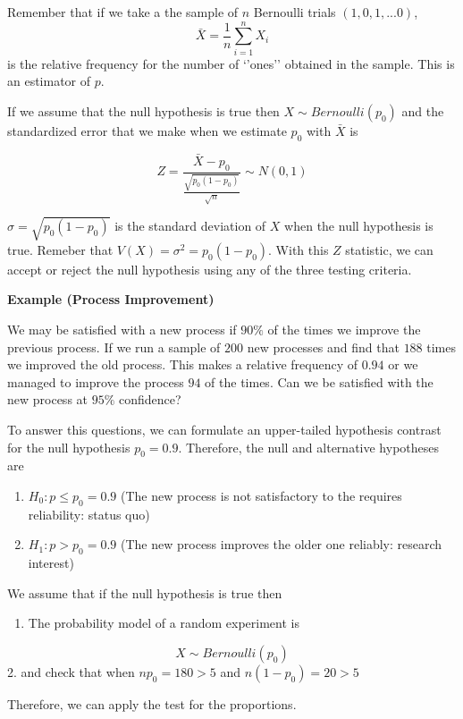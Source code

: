 \documentclass[
]{book}
\providecommand{\tightlist}{%
  \setlength{\itemsep}{0pt}\setlength{\parskip}{0pt}}
\begin{document}
Remember that if we take a the sample of \(n\) Bernoulli trials \((1,0,1,...0)\), \[\bar{X}=\frac{1}{n}\sum_{i=1}^n X_i\] is the relative frequency for the number of `'ones'' obtained in the sample. This is an estimator of \(p\).

If we assume that the null hypothesis is true then \(X \sim Bernoulli(p_0)\) and the standardized error that we make when we estimate \(p_0\) with \(\bar{X}\) is

\[Z=\frac{\bar{X}-p_0}{\frac{\sqrt{p_0(1-p_0)}}{\sqrt{n}}}  \sim N(0,1)\]

\(\sigma=\sqrt{p_0(1-p_0)}\) is the standard deviation of \(X\) when the null hypothesis is true. Remeber that \(V(X)=\sigma^2=p_0(1-p_0)\). With this \(Z\) statistic, we can accept or reject the null hypothesis using any of the three testing criteria.

\textbf{Example (Process Improvement)}

We may be satisfied with a new process if \(90\%\) of the times we improve the previous process. If we run a sample of \(200\) new processes and find that \(188\) times we improved the old process. This makes a relative frequency of \(0.94\) or we managed to improve the process \(94%
\) of the times. Can we be satisfied with the new process at \(95\%\) confidence?

To answer this questions, we can formulate an upper-tailed hypothesis contrast for the null hypothesis \(p_0=0.9\). Therefore, the null and alternative hypotheses are

\begin{enumerate}
\def\labelenumi{\alph{enumi}.}
\tightlist
\item
  \(H_0: p \leq p_0=0.9\) (The new process is not satisfactory to the requires reliability: status quo)
\item
  \(H_1: p> p_0=0.9\) (The new process improves the older one reliably: research interest)
\end{enumerate}

We assume that if the null hypothesis is true then

\begin{enumerate}
\def\labelenumi{\arabic{enumi}.}
\tightlist
\item
  The probability model of a random experiment is
\end{enumerate}

\[X \sim Bernoulli (p_0)\]
2. and check that when \(np_0=180>5\) and \(n(1-p_0)=20>5\)

Therefore, we can apply the test for the proportions.
\end{document}
